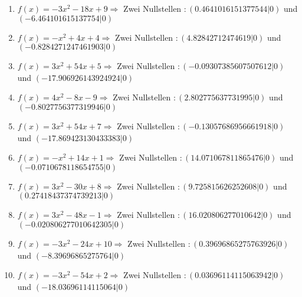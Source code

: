 \documentclass{article}%
\begin{document}
\begin{enumerate}[label=\alph*)]
\item%
\newline\vspace{0.5cm}$f(x)=-3x^2 - 18x + 9 \Rightarrow $ Zwei Nullstellen $: (0.4641016151377544|0) $ und $ (-6.464101615137754|0) $%
\item%
\newline\vspace{0.5cm}$f(x)=-x^2 + 4x + 4 \Rightarrow $ Zwei Nullstellen $: (4.82842712474619|0) $ und $ (-0.8284271247461903|0) $%
\item%
\newline\vspace{0.5cm}$f(x)=3x^2 + 54x + 5 \Rightarrow $ Zwei Nullstellen $: (-0.09307385607507612|0) $ und $ (-17.906926143924924|0) $%
\item%
\newline\vspace{0.5cm}$f(x)=4x^2 - 8x - 9 \Rightarrow $ Zwei Nullstellen $: (2.802775637731995|0) $ und $ (-0.8027756377319946|0) $%
\item%
\newline\vspace{0.5cm}$f(x)=3x^2 + 54x + 7 \Rightarrow $ Zwei Nullstellen $: (-0.13057686956661918|0) $ und $ (-17.869423130433383|0) $%
\item%
\newline\vspace{0.5cm}$f(x)=-x^2 + 14x + 1 \Rightarrow $ Zwei Nullstellen $: (14.071067811865476|0) $ und $ (-0.0710678118654755|0) $%
\item%
\newline\vspace{0.5cm}$f(x)=3x^2 - 30x + 8 \Rightarrow $ Zwei Nullstellen $: (9.725815626252608|0) $ und $ (0.27418437374739213|0) $%
\item%
\newline\vspace{0.5cm}$f(x)=3x^2 - 48x - 1 \Rightarrow $ Zwei Nullstellen $: (16.020806277010642|0) $ und $ (-0.020806277010642305|0) $%
\item%
\newline\vspace{0.5cm}$f(x)=-3x^2 - 24x + 10 \Rightarrow $ Zwei Nullstellen $: (0.39696865275763926|0) $ und $ (-8.39696865275764|0) $%
\item%
\newline\vspace{0.5cm}$f(x)=-3x^2 - 54x + 2 \Rightarrow $ Zwei Nullstellen $: (0.03696114115063942|0) $ und $ (-18.03696114115064|0) $%

\end{enumerate}
\end{document}
